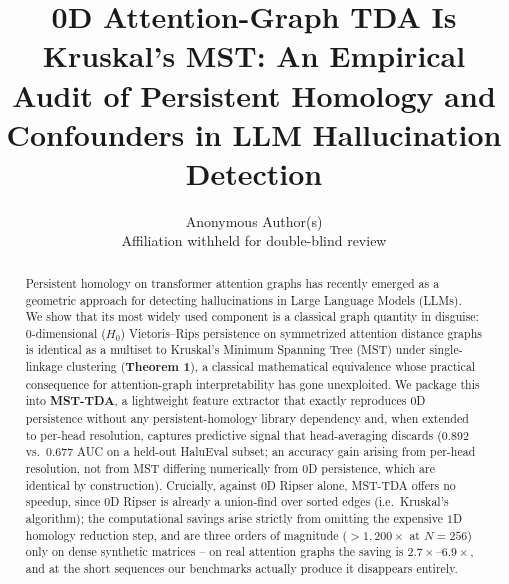 \documentclass{article}
\title{0D Attention-Graph TDA Is Kruskal's MST: An Empirical Audit of Persistent Homology and Confounders in LLM Hallucination Detection}
\author{Anonymous Author(s) \\
Affiliation withheld for double-blind review}
\begin{document}
\maketitle

\begin{abstract}
Persistent homology on transformer attention graphs has recently emerged as a geometric approach for detecting hallucinations in Large Language Models (LLMs). We show that its most widely used component is a classical graph quantity in disguise: $0$-dimensional ($H_0$) Vietoris--Rips persistence on symmetrized attention distance graphs is identical as a multiset to Kruskal's Minimum Spanning Tree (MST) under single-linkage clustering (\textbf{Theorem 1}), a classical mathematical equivalence \citep{gower1969, carlsson2009} whose practical consequence for attention-graph interpretability has gone unexploited. We package this into \textbf{MST-TDA}, a lightweight feature extractor that exactly reproduces $0$D persistence without any persistent-homology library dependency and, when extended to per-head resolution, captures predictive signal that head-averaging discards ($0.892$ vs.\ $0.677$ AUC on a held-out HaluEval subset; an accuracy gain arising from per-head resolution, not from MST differing numerically from $0$D persistence, which are identical by construction). Crucially, against $0$D Ripser alone, MST-TDA offers no speedup, since $0$D Ripser is already a union-find over sorted edges (i.e.\ Kruskal's algorithm); the computational savings arise strictly from omitting the expensive $1$D homology reduction step, and are three orders of magnitude ($>\!1{,}200\times$ at $N{=}256$) only on dense synthetic matrices -- on real attention graphs the saving is $2.7\times$--$6.9\times$, and at the short sequences our benchmarks actually produce it disappears entirely.


\end{abstract}
\end{document}
